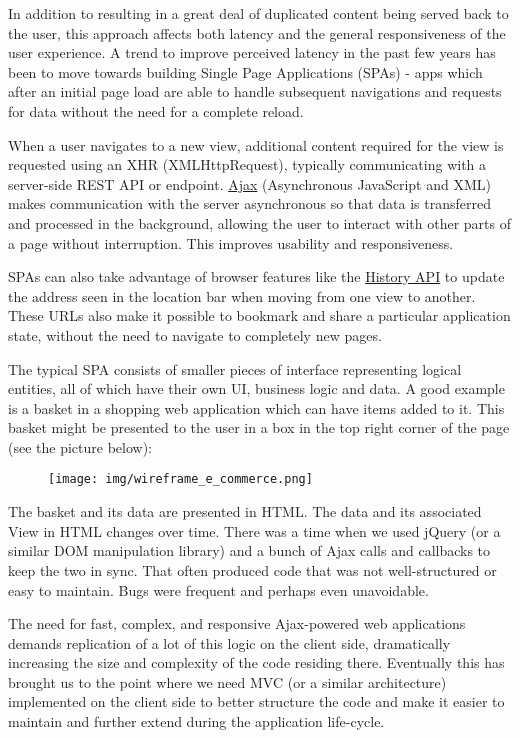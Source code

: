 \documentclass[9pt]{book}
\begin{document}
In addition to resulting in a great deal of duplicated content being
served back to the user, this approach affects both latency and the
general responsiveness of the user experience. A trend to improve
perceived latency in the past few years has been to move towards
building Single Page Applications (SPAs) - apps which after an initial
page load are able to handle subsequent navigations and requests for
data without the need for a complete reload.

When a user navigates to a new view, additional content required for the
view is requested using an XHR (XMLHttpRequest), typically communicating
with a server-side REST API or endpoint.
\href{https://en.wikipedia.org/wiki/Ajax_(programming)}{Ajax}
(Asynchronous JavaScript and XML) makes communication with the server
asynchronous so that data is transferred and processed in the
background, allowing the user to interact with other parts of a page
without interruption. This improves usability and responsiveness.

SPAs can also take advantage of browser features like the
\href{http://diveintohtml5.info/history.html}{History API} to update the
address seen in the location bar when moving from one view to another.
These URLs also make it possible to bookmark and share a particular
application state, without the need to navigate to completely new pages.

The typical SPA consists of smaller pieces of interface representing
logical entities, all of which have their own UI, business logic and
data. A good example is a basket in a shopping web application which can
have items added to it. This basket might be presented to the user in a
box in the top right corner of the page (see the picture below):

\begin{figure}[htbp]
\centering
\texttt{[image: img/wireframe\_e\_commerce.png]}
\end{figure}

The basket and its data are presented in HTML. The data and its
associated View in HTML changes over time. There was a time when we used
jQuery (or a similar DOM manipulation library) and a bunch of Ajax calls
and callbacks to keep the two in sync. That often produced code that was
not well-structured or easy to maintain. Bugs were frequent and perhaps
even unavoidable.

The need for fast, complex, and responsive Ajax-powered web applications
demands replication of a lot of this logic on the client side,
dramatically increasing the size and complexity of the code residing
there. Eventually this has brought us to the point where we need MVC (or
a similar architecture) implemented on the client side to better
structure the code and make it easier to maintain and further extend
during the application life-cycle.
\end{document}
